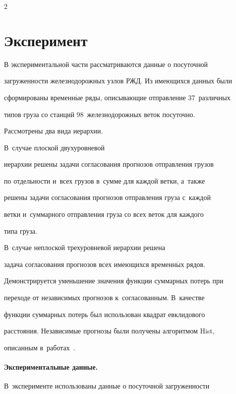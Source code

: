 \begin{multicols}{2}
\begin{table}
\end{table}







\section{Эксперимент}



В экспериментальной части рассматриваются данные о посуточной

загруженности железнодорожных узлов РЖД. Из имеющихся данных были

сформированы временн$\acute{\mbox{ы}}$е ряды, описывающие отправление 37~различных

типов груза со станций 98~железнодорожных веток посуточно.

Рассмотрены два вида иерархии.



В~случае плоской двухуровневой

иерархии решены задачи согласования прогнозов отправления грузов

по отдельности и~всех грузов в~сумме для каждой ветки, а~так\-же

решены задачи согласования прогнозов отправления груза с~каждой

ветки и~суммарного отправления груза со всех веток для каждого

типа груза.



В~случае неплоской трехуровневой иерархии решена

задача согласования прогнозов всех име\-ющих\-ся временн$\acute{\mbox{ы}}$х рядов.

Демонстрируется уменьшение значения функции суммарных потерь при

переходе от независимых прогнозов к~согласованным. В~качестве

функции суммарных потерь был использован квад\-рат евклидового

расстояния. Независимые прогнозы были получены алгоритмом Hist,

описанным в~работах~\cite{stenina2014reconciliation, medvednikova2012nonparametric}.



\vspace*{-5pt}



\paragraph*{Экспериментальные данные.} В~эксперименте использованы данные о посуточной загруженности


\end{multicols}
